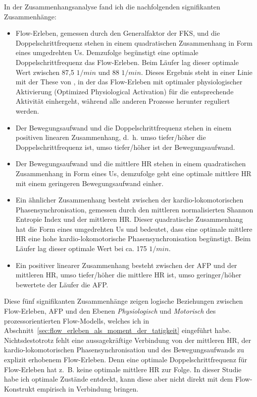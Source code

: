 In der Zusammenhangsanalyse fand ich die nachfolgenden signifikanten Zusammenhänge: 
\begin{itemize}
	
	\item Flow-Erleben, gemessen durch den Generalfaktor der \ac{FKS}, und die Doppelschrittfrequenz stehen in einem quadratischen Zusammenhang in Form eines umgedrehten Us. Demzufolge begünstigt eine optimale Doppelschrittfrequenz das Flow-Erleben. Beim Läufer lag dieser optimale Wert zwischen 87,5 $1/min$ und 88 $1/min$. Dieses Ergebnis steht in einer Linie mit der These von \citet[][S.~148]{Peifer2012}, in der das Flow-Erleben mit optimaler physiologischer Aktivierung (Optimized Physiological Activation) für die entsprechende Aktivität einhergeht, während alle anderen Prozesse herunter reguliert werden.
	
	\item Der Bewegungsaufwand und die Doppelschrittfrequenz stehen in einem positiven linearen Zusammenhang, d.~h. umso tiefer/höher die Doppelschrittfrequenz ist, umso tiefer/höher ist der Bewegungsaufwand.
	
	\item Der Bewegungsaufwand und die mittlere \ac{HR} stehen in einem quadratischen Zusammenhang in Form eines Us, demzufolge geht eine optimale mittlere \ac{HR} mit einem geringeren Bewegungsaufwand einher.
	
	\item Ein ähnlicher Zusammenhang besteht zwischen der kardio-lokomotorischen Phasensynchronisation, gemessen durch den mittleren normalisierten Shannon Entropie Index und der mittleren \ac{HR}. Dieser quadratische Zusammenhang hat die Form eines umgedrehten Us und bedeutet, dass eine optimale mittlere \ac{HR} eine hohe kardio-lokomotorische Phasensynchronisation begünstigt. Beim Läufer lag dieser optimale Wert bei ca. 175 $1/min$.
	
	\item Ein positiver linearer Zusammenhang besteht zwischen der \ac{AFP} und der mittleren \ac{HR}, umso tiefer/höher die mittlere \ac{HR} ist, umso geringer/höher bewertete der Läufer die \ac{AFP}. 
\end{itemize}

Diese fünf signifikanten Zusammenhänge zeigen logische Beziehungen zwischen Flow-Erleben, \ac{AFP} und den Ebenen \emph{Physiologisch} und \emph{Motorisch} des prozessorientierten Flow-Modells, welches ich in Abschnitt~\ref{sec:flow_erleben_als_moment_der_tatigkeit} eingeführt habe. Nichtsdestotrotz fehlt eine aussagekräftige Verbindung von der mittleren \ac{HR}, der kardio-lokomotorischen Phasensynchronisation und des Bewegungsaufwands zu explizit erhobenem Flow-Erleben. Denn eine optimale Doppelschrittfrequenz für Flow-Erleben hat z.~B. keine optimale mittlere \ac{HR} zur Folge. In dieser Studie habe ich optimale Zustände entdeckt, kann diese aber nicht direkt mit dem Flow-Konstrukt empirisch in Verbindung bringen. 


